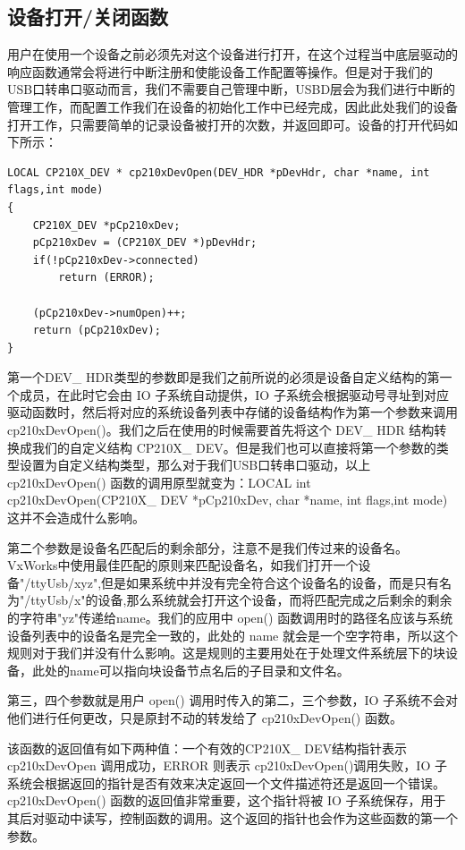 \subsection{设备打开/关闭函数}

	用户在使用一个设备之前必须先对这个设备进行打开，在这个过程当中底层驱动的响应函数通常会将进行中断注册和使能设备工作配置等操作。但是对于我们的USB口转串口驱动而言，我们不需要自己管理中断，USBD层会为我们进行中断的管理工作，而配置工作我们在设备的初始化工作中已经完成，因此此处我们的设备打开工作，只需要简单的记录设备被打开的次数，并返回即可。设备的打开代码如下所示：
	
\lstset{language=C}
\begin{lstlisting}
LOCAL CP210X_DEV * cp210xDevOpen(DEV_HDR *pDevHdr, char *name, int flags,int mode)
{
	CP210X_DEV *pCp210xDev;
	pCp210xDev = (CP210X_DEV *)pDevHdr;
	if(!pCp210xDev->connected)	
		return (ERROR);
		
	(pCp210xDev->numOpen)++;
	return (pCp210xDev);
}
\end{lstlisting}

	第一个DEV\_ HDR类型的参数即是我们之前所说的必须是设备自定义结构的第一个成员，在此时它会由 IO 子系统自动提供，IO 子系统会根据驱动号寻址到对应驱动函数时，然后将对应的系统设备列表中存储的设备结构作为第一个参数来调用 cp210xDevOpen()。我们之后在使用的时候需要首先将这个 DEV\_ HDR 结构转换成我们的自定义结构 CP210X\_ DEV。但是我们也可以直接将第一个参数的类型设置为自定义结构类型，那么对于我们USB口转串口驱动，以上  cp210xDevOpen() 函数的调用原型就变为：LOCAL int cp210xDevOpen(CP210X\_ DEV *pCp210xDev, char *name, int flags,int mode)这并不会造成什么影响。
		
	第二个参数是设备名匹配后的剩余部分，注意不是我们传过来的设备名。VxWorks中使用最佳匹配的原则来匹配设备名，如我们打开一个设备"/ttyUsb/xyz",但是如果系统中并没有完全符合这个设备名的设备，而是只有名为"/ttyUsb/x"的设备,那么系统就会打开这个设备，而将匹配完成之后剩余的剩余的字符串"yz"传递给name。我们的应用中 open() 函数调用时的路径名应该与系统设备列表中的设备名是完全一致的，此处的 name 就会是一个空字符串，所以这个规则对于我们并没有什么影响。这是规则的主要用处在于处理文件系统层下的块设备，此处的name可以指向块设备节点名后的子目录和文件名。

	第三，四个参数就是用户 open() 调用时传入的第二，三个参数，IO 子系统不会对他们进行任何更改，只是原封不动的转发给了 cp210xDevOpen() 函数。
	
	该函数的返回值有如下两种值：一个有效的CP210X\_ DEV结构指针表示 cp210xDevOpen 调用成功，ERROR 则表示 cp210xDevOpen()调用失败，IO 子系统会根据返回的指针是否有效来决定返回一个文件描述符还是返回一个错误。cp210xDevOpen() 函数的返回值非常重要，这个指针将被 IO 子系统保存，用于其后对驱动中读写，控制函数的调用。这个返回的指针也会作为这些函数的第一个参数。
	
